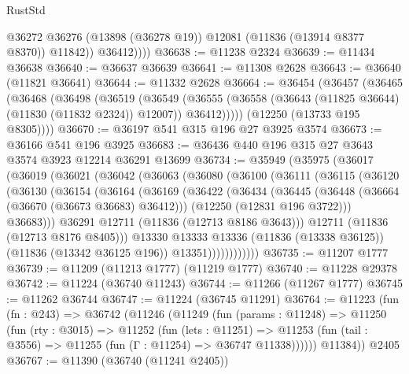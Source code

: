 \begin{lexlean}{RustStd}
\begin{coremodule}
                @36272
                @36276
                (@13898 (@36278 @19))
                @12081
                (@11836 (@13914 @8377 @8370))
                @11842))
            @36412))))
@36638 := @11238 @2324
@36639 := @11434 @36638
@36640 := @36637 @36639
@36641 := @11308 @2628
@36643 := @36640 (@11821 @36641)
@36644 := @11332 @2628
@36664 := @36454
    (@36457
      (@36465
        (@36468
          (@36498
            (@36519
              (@36549
                (@36555 (@36558 (@36643 (@11825 @36644) (@11830 (@11832 @2324)) @12007)) @36412)))))
        (@12250 (@13733 @195 @8305))))
@36670 := @36197 @541 @315 @196 @27 @3925 @3574
@36673 := @36166 @541 @196 @3925
@36683 := @36436 @440 @196 @315 @27 @3643 @3574 @3923 @12214 @36291 @13699
@36734 := @35949
    (@35975
      (@36017
        (@36019
          (@36021
            (@36042
              (@36063
                (@36080
                  (@36100
                    (@36111
                      (@36115
                        (@36120
                          (@36130
                            (@36154
                              (@36164
                                (@36169
                                  (@36422
                                    (@36434
                                      (@36445
                                        (@36448 (@36664 (@36670 (@36673 @36683) @36412)))
                                        (@12250 (@12831 @196 @3722)))
                                      @36683)))
                                @36291
                                @12711
                                (@11836 (@12713 @8186 @3643)))
                              @12711
                              (@11836 (@12713 @8176 @8405)))
                            @13330
                            @13333
                            @13336
                            (@11836 (@13338 @36125))
                            (@11836 (@13342 @36125 @196))
                            @13351))))))))))))
@36735 := @11207 @1777
@36739 := @11209 (@11213 @1777) (@11219 @1777)
@36740 := @11228 @29378
@36742 := @11224 (@36740 @11243)
@36744 := @11266 (@11267 @1777)
@36745 := @11262 @36744
@36747 := @11224 (@36745 @11291)
@36764 := @11223
    (fun (fn : @243) =>
    @36742
      (@11246
        (@11249
          (fun (params : @11248) =>
          @11250
            (fun (rty : @3015) =>
            @11252
              (fun (lets : @11251) =>
              @11253 (fun (tail : @3556) => @11255 (fun (Γ : @11254) => @36747 @11338))))))
        @11384))
    @2405
@36767 := @11390 (@36740 (@11241 @2405))

\end{coremodule}
\end{lexlean}
